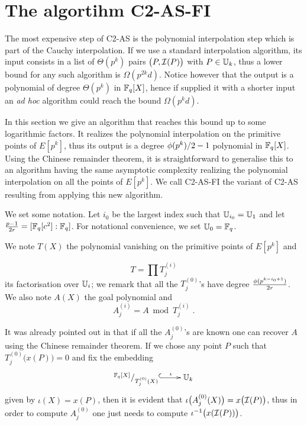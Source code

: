\section{The algortihm C2-AS-FI}
\label{sec:C2-AS-FI}

The most expensive step of C2-AS is the polynomial interpolation step
which is part of the Cauchy interpolation. If we use a standard
interpolation algorithm, its input consists in a list of $\Theta(p^k)$
pairs $\bigl(P, \mathcal{I}(P)\bigr)$ with $P\in\mathbb{U}_k$, thus a lower bound for
any such algorithm is $\Omega(p^{2k}d)$. Notice however that the
output is a polynomial of degree $\Theta(p^k)$ in $\mathbb{F}_q[X]$, hence if
supplied it with a shorter input an \emph{ad hoc} algorithm could
reach the bound $\Omega(p^kd)$.

In this section we give an algorithm that reaches this bound up to
some logarithmic factors. It realizes the polynomial interpolation on
the primitive points of $E[p^k]$, thus its output is a degree
$\phi(p^k)/2-1$ polynomial in $\mathbb{F}_q[X]$. Using the Chinese remainder
theorem, it is straightforward to generalise this to an algorithm
having the same asymptotic complexity realizing the polynomial
interpolation on all the points of $E[p^k]$. We call C2-AS-FI the
variant of C2-AS resulting from applying this new algorithm.

We set some notation. Let $i_0$ be the largest index such that
$\mathbb{U}_{i_0} = \mathbb{U}_1$ and let $\frac{p-1}{2r} = [\mathbb{F}_q[c^2]:\mathbb{F}_q]$. For
notational convenience, we set $\mathbb{U}_0=\mathbb{F}_q$.

We note $T(X)$ the polynomial vanishing on the primitive points of
$E[p^k]$ and

\begin{equation}
  \label{eq:T}
  T = \prod T_j^{(i)}
\end{equation}
its factorisation over $\mathbb{U}_i$; we remark that all the $T_j^{(0)}$'s
have degree $\frac{\phi(p^{k-i_0+1})}{2r}$. We also note $A(X)$ the goal
polynomial and
\begin{equation}
  \label{eq:A}
  A_j^{(i)} = A \bmod T_j^{(i)}
  \;\text{.}
\end{equation}

It was already pointed out in \cite[$\S$2.3]{Cou96} that if all the
$A_j^{(0)}$'s are known one can recover $A$ using the Chinese remainder
theorem. If we chose any point $P$ such that
$T_j^{(0)}\bigl(x(P)\bigr)=0$ and fix the embedding
\begin{equation}
  \label{eq:embed}
  \xymatrix{
    ^{\F_q[X]}/_{T_j^{(0)}(X)} \ar@{^{(}->}[r]^-\iota & \U_k
  }
\end{equation}
given by $\iota(X) = x(P)$, then it is evident that
$\iota\bigl(A_j^{(0)}(X)\bigr) = x\bigl(\mathcal{I}(P)\bigr)$, thus in order to
compute $A_j^{(0)}$ one just needs to compute
$\iota^{-1}\bigl(x(\mathcal{I}(P))\bigr)$.

